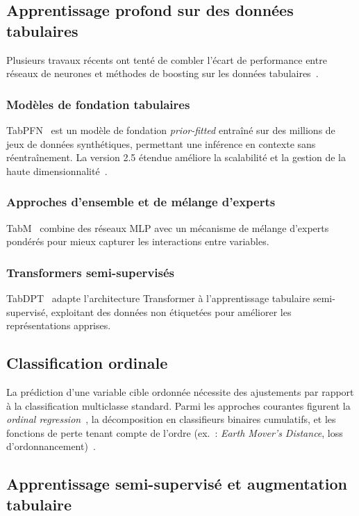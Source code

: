\documentclass[conference]{IEEEtran}
\begin{document}
\subsection{Apprentissage profond sur des données tabulaires}

Plusieurs travaux récents ont tenté de combler l'écart de performance entre réseaux de
neurones et méthodes de boosting sur les données tabulaires~\cite{grinsztajn2022tree}.

\subsubsection{Modèles de fondation tabulaires}
TabPFN~\cite{hollmann2022tabpfn} est un modèle de fondation \textit{prior-fitted} entraîné
sur des millions de jeux de données synthétiques, permettant une inférence en contexte sans
réentraînement. La version 2.5 étendue améliore la scalabilité et la gestion de la haute
dimensionnalité~\cite{hollmann2025tabpfn2}.

\subsubsection{Approches d'ensemble et de mélange d'experts}
TabM~\cite{gorishniy2024tabm} combine des réseaux MLP avec un mécanisme de mélange
d'experts pondérés pour mieux capturer les interactions entre variables.

\subsubsection{Transformers semi-supervisés}
TabDPT~\cite{tabdpt2024} adapte l'architecture Transformer à l'apprentissage tabulaire semi-supervisé,
exploitant des données non étiquetées pour améliorer les représentations apprises.

\subsection{Classification ordinale}

La prédiction d'une variable cible ordonnée nécessite des ajustements par rapport à la
classification multiclasse standard. Parmi les approches courantes figurent la
\textit{ordinal regression}~\cite{frank2001simple}, la décomposition en classifieurs
binaires cumulatifs, et les fonctions de perte tenant compte de l'ordre (ex.~: \textit{Earth
Mover's Distance}, loss d'ordonnancement)~\cite{TODO}.

\subsection{Apprentissage semi-supervisé et augmentation tabulaire}
\end{document}
